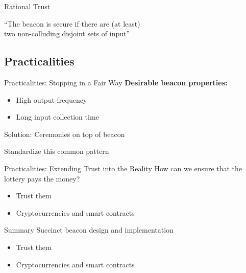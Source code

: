 \begin{frame}{Rational Trust}

    \centering
    \enquote{The beacon is secure if there are (at least)\\two non-colluding disjoint sets of input}

    \vspace{.3cm}

\end{frame}

\subsection{Practicalities}

\begin{frame}{Practicalities: Stopping in a Fair Way}
    \textbf{Desirable beacon properties:}
    \begin{itemize}
        \item High output frequency
        \item Long input collection time
    \end{itemize}

    \vspace{.7cm}
    \centering
    \pause
    Solution: Ceremonies on top of beacon

    \vspace{.3em}
    \pause
    Standardize this common pattern

\end{frame}

\begin{frame}{Practicalities: Extending Trust into the Reality}
    How can we ensure that the lottery pays the money?
    \pause
    \begin{itemize}
        \item Trust them
        \pause
        \item Cryptocurrencies and smart contracts
    \end{itemize}
\end{frame}

\begin{frame}{Summary}
    Succinct beacon design and implementation
    \pause
    \begin{itemize}
        \item Trust them
        \pause
        \item Cryptocurrencies and smart contracts
    \end{itemize}
\end{frame}
